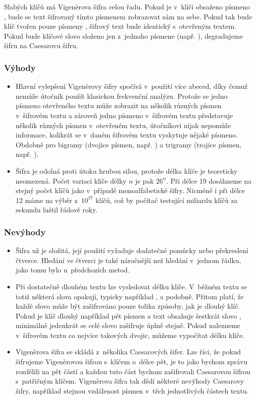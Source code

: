\documentclass[12pt]{article}
\theoremstyle{definition}
\begin{document}
Slabých klíčů má Vigenèrova šifra celou řadu. Pokud je v~klíči obsaženo písmeno , bude se text šifrovaný tímto písmenem zobrazovat sám na sebe. Pokud tak bude klíč tvořen pouze písmeny , šifrový text bude identický s~otevřeným textem. Pokud bude klíčové slovo složeno jen z~jednoho písmene (např. ), degradujeme šifru na Caesarovu šifru. %

\subsubsection{Výhody}
\begin{itemize}
\item Hlavní vylepšení Vigenèrovy šifry spočívá v~použití více abeced, díky čemuž nemůže útočník použít klasickou frekvenční analýzu. Protože se jedno písmeno otevřeného textu může zobrazit na několik různých písmen v~šifrovém textu a zároveň jedno písmeno v~šifrovém textu představuje několik různých písmen v~otevřeném textu, útočníkovi nijak nepomůže informace, kolikrát se v~daném šifrovém textu vyskytuje nějaké písmeno. Obdobně pro bigramy (dvojice písmen, např. ) a trigramy (trojice písmen, např. ).
\item Šifra je odolná proti útoku hrubou silou, protože délka klíče je teoreticky neomezená. Počet variací klíče délky $n$ je pak $26^n$. Při délce 19 dosáhneme na stejný počet klíčů jako v~případě monoalfabetické šifry. Nicméně i při délce 12 máme na výběr z~$10^{17}$ klíčů, což by počítač testující miliardu klíčů za sekundu luštil řádově roky. 
\end{itemize}

\subsubsection{Nevýhody}
\begin{itemize}
\item Šifra už je složitá, její použití vyžaduje dodatečné pomůcky nebo překreslení čtverce. Hledání ve čtverci je také náročnější než hledání v~jednom řádku, jako tomu bylo u~předchozích metod. 
\item Při dostatečně dlouhém textu lze vysledovat délku klíče. V~běžném textu se totiž některá slova opakují, typicky například ,  a podobně. Přitom platí, že každé slovo může být zašifrováno pouze tolika způsoby, jak je dlouhý klíč. Pokud je klíč dlouhý například pět písmen a text obsahuje šestkrát slovo , minimálně jedenkrát se celé slovo zašifruje úplně stejně. Pokud nalezneme v~šifrovém textu co nejvíce takových dvojic, můžeme vypočítat délku klíče. 
\item Vigenèrova šifra se skládá z~několika Caesarových šifer. Lze říci, že pokud šifrujeme Vigenèrovou šifrou s~klíčem o~délce pět, je to jako bychom zprávu rozdělili na pět částí a každou tuto část bychom zašifrovali Caesarovou šifrou s~patřičným klíčem. Vigenèrova šifra tak dědí některé nevýhody Caesarovy šifry, například stejnou vzdálenost písmen v~těch jednotlivých částech textu. 
\end{itemize}
\end{document}
